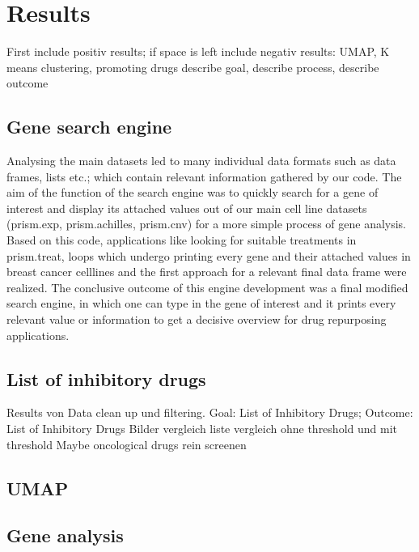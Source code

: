 \documentclass[
  11pt,
]{article}
\begin{document}
\hypertarget{results}{%
\section{Results}\label{results}}

First include positiv results; if space is left include negativ results:
UMAP, K means clustering, promoting drugs describe goal, describe
process, describe outcome

\hypertarget{gene-search-engine}{%
\subsection{Gene search engine}\label{gene-search-engine}}

Analysing the main datasets led to many individual data formats such as
data frames, lists etc.; which contain relevant information gathered by
our code. The aim of the function of the search engine was to quickly
search for a gene of interest and display its attached values out of our
main cell line datasets (prism.exp, prism.achilles, prism.cnv) for a
more simple process of gene analysis. Based on this code, applications
like looking for suitable treatments in prism.treat, loops which undergo
printing every gene and their attached values in breast cancer celllines
and the first approach for a relevant final data frame were realized.
The conclusive outcome of this engine development was a final modified
search engine, in which one can type in the gene of interest and it
prints every relevant value or information to get a decisive overview
for drug repurposing applications.

\hypertarget{list-of-inhibitory-drugs}{%
\subsection{List of inhibitory drugs}\label{list-of-inhibitory-drugs}}

Results von Data clean up und filtering. Goal: List of Inhibitory Drugs;
Outcome: List of Inhibitory Drugs Bilder vergleich liste vergleich ohne
threshold und mit threshold Maybe oncological drugs rein screenen

\hypertarget{umap}{%
\subsection{UMAP}\label{umap}}

\hypertarget{gene-analysis}{%
\subsection{Gene analysis}\label{gene-analysis}}
\end{document}

